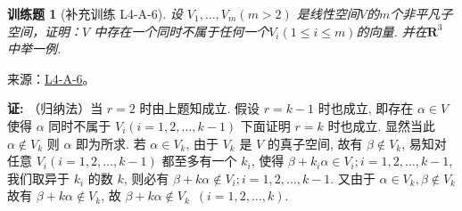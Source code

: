 \documentclass[UTF8,12pt,a4paper,fontset=fandol]{ctexart}
\newtheorem{exercise}{训练题}[section]
\begin{document}
\begin{exercise}[补充训练 L4-A-6]\label{prob:L4-A-6}
设 $V_1,\ldots,V_m (m > 2)$ 是线性空间$V$的$m$个非平凡子空间，证明：$V$ 中存在一个同时不属于任何一个$V_i(1 \leqslant i \leqslant m)$的向量. 并在$\mathbf{R}^3$ 中举一例.
\end{exercise}
\noindent 来源：\href{https://github.com/yhwu-is/Linear-Algebra-Left-Undone/blob/new/%E8%AE%B2%E4%B9%89/%E4%B8%93%E9%A2%98/4%20%E7%BA%BF%E6%80%A7%E7%A9%BA%E9%97%B4%E7%9A%84%E8%BF%90%E7%AE%97.tex}{L4-A-6}。
\begin{solve}
\label{eg:4:A:5}
          \textbf{证:} （归纳法）当 $r=2$ 时由上题知成立.
          假设 $r = k-1$ 时也成立, 即存在 $\alpha \in V$
          使得 $\alpha$ 同时不属于 $V_i (i=1,2,\ldots,k-1)$
          下面证明 $r=k$ 时也成立. 显然当此 $\alpha \notin V_k$ 则 $\alpha$ 即为所求.
           若 $\alpha \in V_k$, 由于 $V_k$ 是 $V$ 的真子空间, 故有 $\beta \notin V_k$, 易知对任意 $V_i (i=1,2,\ldots,k-1)$ 都至多有一个 $k_i$, 使得 $\beta + k_i \alpha \in V_i; i=1,2,\ldots,k-1$, 我们取异于 $k_i$ 的数 $k$, 则必有 $\beta + k \alpha \notin V_i; i=1,2,\ldots,k-1$. 又由于 $\alpha \in V_k, \beta \notin V_k$ 故有 $\beta + k \alpha \notin V_k$, 故 $\beta + k \alpha \notin V_k \enspace (i = 1,2,\ldots,k)$.
\end{solve}
\end{document}
